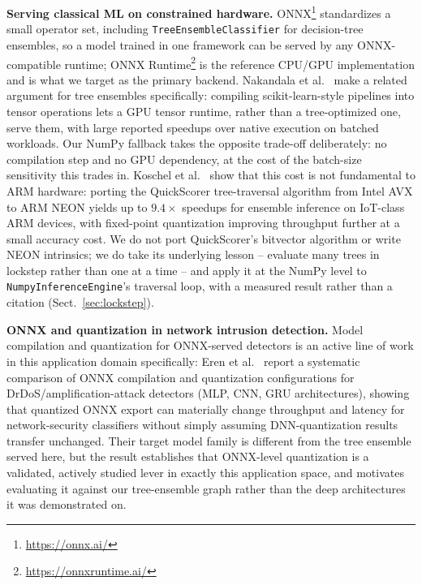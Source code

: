 \documentclass[runningheads]{llncs}
\begin{document}
\textbf{Serving classical ML on constrained hardware.} ONNX\footnote{\url{https://onnx.ai/}} standardizes a small operator set, including \texttt{TreeEnsembleClassifier} for decision-tree ensembles, so a model trained in one framework can be served by any ONNX-compatible runtime; ONNX Runtime\footnote{\url{https://onnxruntime.ai/}} is the reference CPU/GPU implementation and is what we target as the primary backend. Nakandala et al.~\cite{nakandala2020hummingbird} make a related argument for tree ensembles specifically: compiling scikit-learn-style pipelines into tensor operations lets a GPU tensor runtime, rather than a tree-optimized one, serve them, with large reported speedups over native execution on batched workloads. Our NumPy fallback takes the opposite trade-off deliberately: no compilation step and no GPU dependency, at the cost of the batch-size sensitivity this trades in. Koschel et al.~\cite{koschel2023arm} show that this cost is not fundamental to ARM hardware: porting the QuickScorer tree-traversal algorithm from Intel AVX to ARM NEON yields up to $9.4\times$ speedups for ensemble inference on IoT-class ARM devices, with fixed-point quantization improving throughput further at a small accuracy cost. We do not port QuickScorer's bitvector algorithm or write NEON intrinsics; we do take its underlying lesson -- evaluate many trees in lockstep rather than one at a time -- and apply it at the NumPy level to \texttt{NumpyInferenceEngine}'s traversal loop, with a measured result rather than a citation (Sect.~\ref{sec:lockstep}).

\textbf{ONNX and quantization in network intrusion detection.} Model compilation and quantization for ONNX-served detectors is an active line of work in this application domain specifically: Eren et al.~\cite{eren2026drdos} report a systematic comparison of ONNX compilation and quantization configurations for DrDoS/amplification-attack detectors (MLP, CNN, GRU architectures), showing that quantized ONNX export can materially change throughput and latency for network-security classifiers without simply assuming DNN-quantization results transfer unchanged. Their target model family is different from the tree ensemble served here, but the result establishes that ONNX-level quantization is a validated, actively studied lever in exactly this application space, and motivates evaluating it against our tree-ensemble graph rather than the deep architectures it was demonstrated on.
\end{document}
